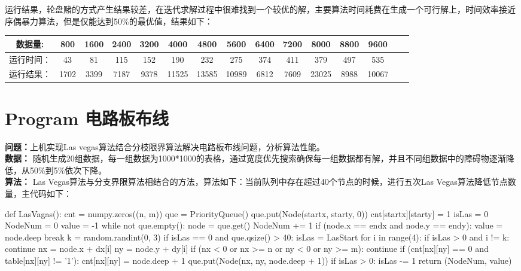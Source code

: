 \documentclass[paper=a4,margin=0.5cm]{scrartcl} %
\begin{document}
\indent 运行结果，轮盘赌的方式产生结果较差，在迭代求解过程中很难找到一个较优的解，主要算法时间耗费在生成一个可行解上，时间效率接近序偶暴力算法，但是仅能达到50\%的最优值，结果如下：\\
\begin{tabular}{ccccccccccccccc}
	\hline 
	数据量: & 800 & 1600 & 2400 & 3200 & 4000 & 4800 & 5600 & 6400 & 7200 & 8000 & 8800 & 9600\\ 
	\hline 
	运行时间：& 43 & 81 & 115 & 152 & 190 & 232 & 275 & 374 & 411 & 379 & 497 & 535 \\ 
	\hline 
	运行结果：& 1702 & 3399 & 7187 & 9378 & 11525 & 13585 & 10989 & 6812 & 7609 & 23025 & 8988 & 10067\\ 
	\hline 
\end{tabular}



\section{Program 电路板布线}
\indent \textbf{问题：}上机实现Las vegas算法结合分枝限界算法解决电路板布线问题，分析算法性能。\\
\indent \textbf{数据：} 随机生成20组数据，每一组数据为1000*1000的表格，通过宽度优先搜索确保每一组数据都有解，并且不同组数据中的障碍物逐渐降低，从50\%到5\%依次下降。\\
\indent \textbf{算法：} Las Vegas算法与分支界限算法相结合的方法，算法如下：当前队列中存在超过40个节点的时候，进行五次Las Vegas算法降低节点数量，主代码如下：\\

\begin{python}
def LasVagas():
	cnt = numpy.zeros((n, m))
	que = PriorityQueue()
	que.put(Node(startx, starty, 0))
	cnt[startx][starty] = 1
	isLas = 0
	NodeNum = 0
	value = -1
	while not que.empty():
		node = que.get()
		NodeNum += 1
		if (node.x == endx and node.y == endy):
			value = node.deep
			break
		k = random.randint(0, 3)
		if isLas == 0 and que.qsize() > 40:
			isLas = LasStart
		for i in range(4):
			if isLas > 0 and i != k:
				continue            
			nx = node.x + dx[i]
			ny = node.y + dy[i]
			if (nx < 0 or nx >= n or ny < 0 or ny >= m):
				continue
			if (cnt[nx][ny] == 0 and table[nx][ny] != '1'):
				cnt[nx][ny] = node.deep + 1
				que.put(Node(nx, ny, node.deep + 1))
		if isLas > 0:
			isLas -= 1
		return (NodeNum, value)
\end{python}
\end{document}
